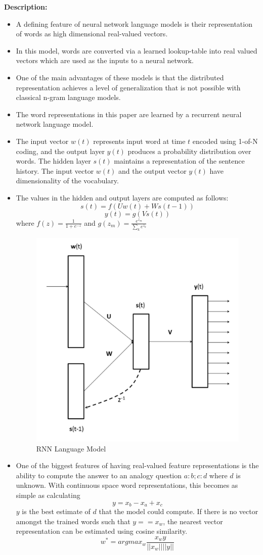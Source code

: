 \documentclass[11pt,a4paper]{article}
\begin{document}
  \textbf{Description:}
  \begin{itemize}
    \item
    A defining feature of neural network language models is their representation of words as high dimensional real-valued vectors.
    \item
    In this model, words are converted via a learned lookup-table into real valued vectors which are used as the inputs to a neural network.
    \item
    One of the main advantages of these models is that the distributed representation achieves a level of generalization that is not possible with classical n-gram language models.
    \item
    The word representations in this paper are learned by a recurrent neural network language model.
    \item
    The input vector $w(t)$ represents input word at time $t$ encoded using 1-of-N coding, and the output layer $y(t)$ produces a probability distribution over words. The hidden layer $s(t)$ maintains a representation of the sentence history. The input vector $w(t)$ and the output vector $y(t)$ have dimensionality of the vocabulary.
    \item
    The values in the hidden and output layers are computed as follows:
    $$s(t) = f(Uw(t) + Ws(t-1))$$
    $$y(t) = g(Vs(t))$$
    where
    $f(z) = \frac{1}{1 + e^{-z}}$ and $g(z_m) = \frac{e^{z_m}}{\sum_k e^{z_k}} $
    \begin{figure}[ht]
      \centering
      \includegraphics[width=.4\textwidth]{rnn-lang-model.png}
      \caption{RNN Language Model}
      \label{fig:rnn-lang-model}
    \end{figure}
    \item
    One of the biggest features of having real-valued feature representations is the ability to compute the answer to an analogy question $a:b; c:d$ where $d$ is unknown. With continuous space word representations, this becomes as simple as calculating
    $$y = x_b - x_a + x_c$$
    $y$ is the best estimate of $d$ that the model could compute. If there is no vector amongst the trained words such that $y == x_w$, the nearest vector representation can be estimated using cosine similarity.
    $$w^* = argmax_w \frac{x_w y}{||x_w|| ||y||}$$
  \end{itemize}
\end{document}
